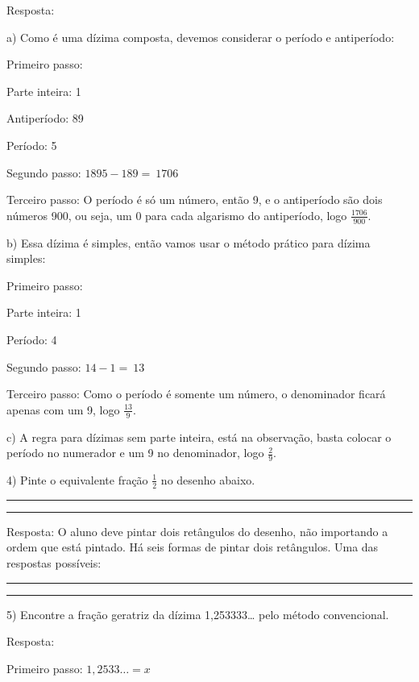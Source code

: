 Resposta:

a) Como é uma dízima composta, devemos considerar o período e
antiperíodo:

Primeiro passo:

Parte inteira: 1

Antiperíodo: 89

Período: 5

Segundo passo: \(1895 - 189 = \ 1706\)

Terceiro passo: O período é só um número, então 9, e o antiperíodo são
dois números 900, ou seja, um 0 para cada algarismo do antiperíodo, logo
\(\frac{1706}{900}\).

b) Essa dízima é simples, então vamos usar o método prático para dízima
simples:

Primeiro passo:

Parte inteira: 1

Período: 4

Segundo passo: \(14 - 1 = \ 13\)

Terceiro passo: Como o período é somente um número, o denominador ficará
apenas com um 9, logo \(\frac{13}{9}\).

c) A regra para dízimas sem parte inteira, está na observação, basta
colocar o período no numerador e um 9 no denominador, logo
\(\frac{2}{9}\).

4) Pinte o equivalente fração \(\frac{1}{2}\) no desenho abaixo.

\begin{center}\rule{0.5\linewidth}{0.5pt}\end{center}

\begin{center}\rule{0.5\linewidth}{0.5pt}\end{center}

Resposta: O aluno deve pintar dois retângulos do desenho, não importando
a ordem que está pintado. Há seis formas de pintar dois retângulos. Uma
das respostas possíveis:

\begin{center}\rule{0.5\linewidth}{0.5pt}\end{center}

\begin{center}\rule{0.5\linewidth}{0.5pt}\end{center}

5) Encontre a fração geratriz da dízima 1,253333\ldots{} pelo método
convencional.

Resposta:

Primeiro passo: \(1,2533\ldots = x\)

